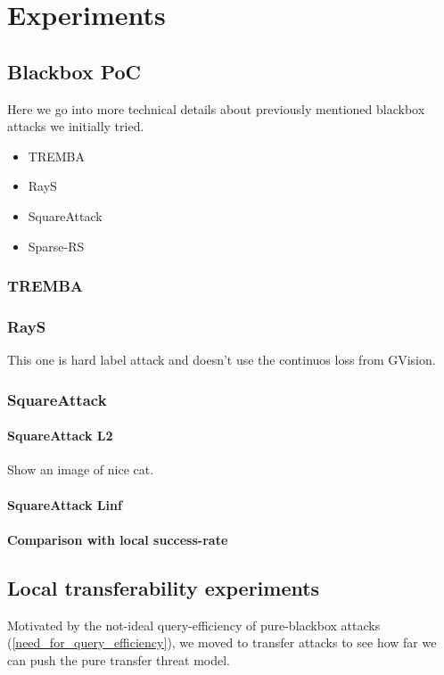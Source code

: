 \chapter{Experiments}
\label{experiments_chap}

\section{Blackbox PoC}
Here we go into more technical details about previously mentioned blackbox attacks we initially tried.

\begin{itemize}
    \item TREMBA
    \item RayS
    \item SquareAttack
    \item Sparse-RS
\end{itemize}

\subsection{TREMBA}

\subsection{RayS}
This one is hard label attack and doesn't use the continuos loss from GVision.

\subsection{SquareAttack}

\subsubsection{SquareAttack L2}
Show an image of nice cat.

\subsubsection{SquareAttack Linf}

\subsubsection{Comparison with local success-rate}



\section{Local transferability experiments}
Motivated by the not-ideal query-efficiency of pure-blackbox attacks (\ref{need_for_query_efficiency}), we moved to transfer attacks to see how far we can push the pure transfer threat model.


